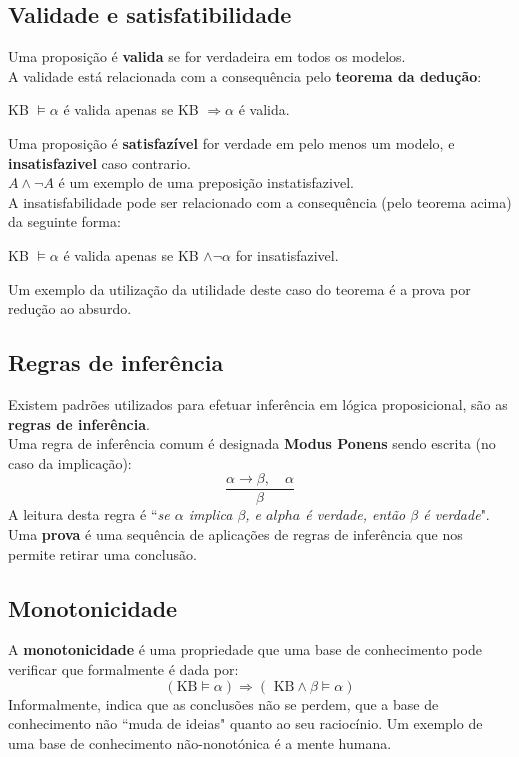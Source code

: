 \documentclass[]{report}
\begin{document}
\subsection{Validade e satisfatibilidade}
Uma proposição é \textbf{valida} se for verdadeira em todos os modelos.\\
A validade está relacionada com a consequência pelo \textbf{teorema da dedução}:
\begin{center}
KB $\models \alpha$ é valida apenas se KB $\Rightarrow \alpha$ é valida.
\end{center}
Uma proposição é \textbf{satisfazível} for verdade em pelo menos um modelo, e \textbf{insatisfazivel} caso contrario.\\
$A \wedge \neg A$ é um exemplo de uma preposição instatisfazivel.\\[2mm]
A insatisfabilidade pode ser relacionado com a consequência (pelo teorema acima) da seguinte forma:
\begin{center}
KB $\models \alpha$ é valida apenas se KB $\wedge \neg \alpha$ for insatisfazivel.
\end{center}
Um exemplo da utilização da utilidade deste caso do teorema é a prova por redução ao absurdo.
\subsection{Regras de inferência}
Existem padrões utilizados para efetuar inferência em lógica proposicional, são as \textbf{regras de inferência}.\\
Uma regra de inferência comum é designada \textbf{Modus Ponens} sendo escrita (no caso da implicação):
$$\frac{\alpha\to \beta, \quad \alpha}{\beta}$$
A leitura desta regra é ``\textit{se $\alpha$ implica $\beta$, e $alpha$ é verdade, então $\beta$ é verdade}".\\[2mm]
Uma \textbf{prova} é uma sequência de aplicações de regras de inferência que nos permite retirar uma conclusão.
\subsection{Monotonicidade}
A \textbf{monotonicidade} é uma propriedade que uma base de conhecimento pode verificar que formalmente é dada por:
$$(\text{KB}\models \alpha) \Rightarrow (\text{ KB}\wedge \beta \models \alpha)$$
Informalmente, indica que as conclusões não se perdem, que a base de conhecimento não ``muda de ideias" quanto ao seu raciocínio.
Um exemplo de uma base de conhecimento não-nonotónica é a mente humana.
\end{document}
